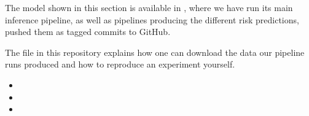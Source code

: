 \begin{tcolorbox}[
    title=\faIcon{recycle} Reproducibility,
    parbox=false,
    float
]
    The model shown in this section is available in , where we have run its main inference pipeline, as well as pipelines producing the different risk predictions, pushed them as tagged commits to GitHub.

    The  file in this repository explains how one can download the data our pipeline runs produced and how to reproduce an experiment yourself.

    \begin{itemize}
        \item {}
        \item {}
        \item {}
    \end{itemize}
\end{tcolorbox}

